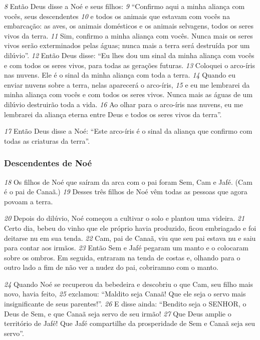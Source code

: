 \bigskip
\textit{\tiny 8}
 Então Deus disse a Noé e seus filhos: 
\textit{\tiny 9}
 “Confirmo aqui a minha aliança com vocês, seus descendentes 
\textit{\tiny 10}
 e todos os animais que estavam com vocês na embarcação: as aves, os animais domésticos e os animais selvagens, todos os seres vivos da terra. 
\textit{\tiny 11}
 Sim, confirmo a minha aliança com vocês. Nunca mais os seres vivos serão exterminados pelas águas; nunca mais a terra será destruída por um dilúvio”. 
\textit{\tiny 12}
 Então Deus disse: “Eu lhes dou um sinal da minha aliança com vocês e com todos os seres vivos, para todas as gerações futuras. 
\textit{\tiny 13}
 Coloquei o arco-íris nas nuvens. Ele é o sinal da minha aliança com toda a terra. 
\textit{\tiny 14}
 Quando eu enviar nuvens sobre a terra, nelas aparecerá o arco-íris, 
\textit{\tiny 15}
 e eu me lembrarei da minha aliança com vocês e com todos os seres vivos. Nunca mais as águas de um dilúvio destruirão toda a vida. 
\textit{\tiny 16}
 Ao olhar para o arco-íris nas nuvens, eu me lembrarei da aliança eterna entre Deus e todos os seres vivos da terra”.



\bigskip
\textit{\tiny 17}
 Então Deus disse a Noé: “Este arco-íris é o sinal da aliança que confirmo com todas as criaturas da terra”.



\bigskip
\subsubsection*{Descendentes de Noé}
\textit{\tiny 18}
 Os filhos de Noé que saíram da arca com o pai foram Sem, Cam e Jafé. (Cam é o pai de Canaã.) 
\textit{\tiny 19}
 Desses três filhos de Noé vêm todas as pessoas que agora povoam a terra.



\bigskip
\textit{\tiny 20}
 Depois do dilúvio, Noé começou a cultivar o solo e plantou uma videira. 
\textit{\tiny 21}
 Certo dia, bebeu do vinho que ele próprio havia produzido, ficou embriagado e foi deitarse nu em sua tenda. 
\textit{\tiny 22}
 Cam, pai de Canaã, viu que seu pai estava nu e saiu para contar aos irmãos. 
\textit{\tiny 23}
 Então Sem e Jafé pegaram um manto e o colocaram sobre os ombros. Em seguida, entraram na tenda de costas e, olhando para o outro lado a fim de não ver a nudez do pai, cobriramno com o manto.


\bigskip
\textit{\tiny 24}
 Quando Noé se recuperou da bebedeira e descobriu o que Cam, seu filho mais novo, havia feito, 
\textit{\tiny 25}
 exclamou: “Maldito seja Canaã! Que ele seja o servo mais insignificante de seus parentes!”. 
\textit{\tiny 26}
 E disse ainda: “Bendito seja o SENHOR, o Deus de Sem, e que Canaã seja servo de seu irmão! 
\textit{\tiny 27}
 Que Deus amplie o território de Jafé! Que Jafé compartilhe da prosperidade de Sem e Canaã seja seu servo”.



